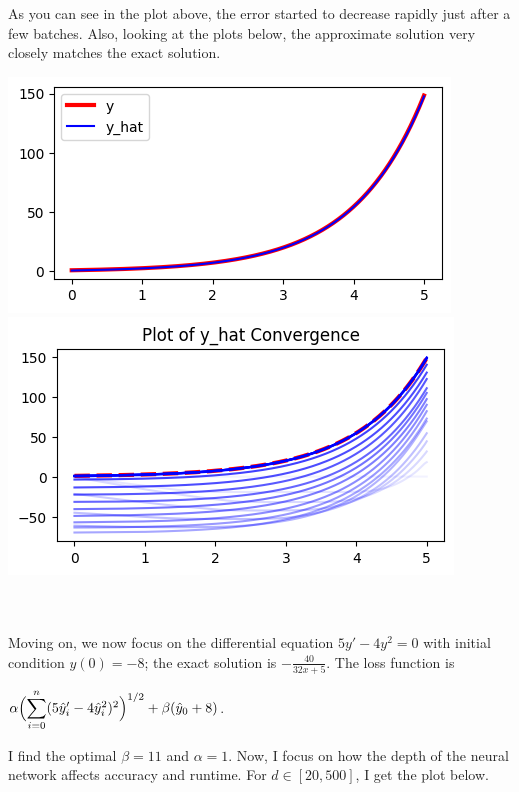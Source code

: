 \documentclass[12pt]{article}
\newcommand{\dsum}[2]{\mathlarger{\sum}_{#1}^{#2}}
\newcommand{\bgc}{\begin{center}}
\newcommand{\enc}{\end{center}}
\begin{document}
\begin{description}
\begin{minipage}{\linewidth}
    \end{minipage}
    As you can see in the plot above, the error started to decrease rapidly
    just after a few batches. Also, looking at the plots below, the approximate
    solution very closely matches the exact solution. \\
    \begin{minipage}{\linewidth}
        \centering
        \includegraphics[scale=.5]{images/figure3.png}
        \includegraphics[scale=.5]{images/figure4.png}
    \end{minipage}
    \hfill \\
    \hline
    \hfill \\
    Moving on, we now focus on the differential equation $5y' - 4y^2 = 0$ with
    initial condition $y(0) = -8$; the exact solution is $-\frac{40}{32x+5}$.
    The loss function is 
    \bgc 
    $\alpha\Bigl(\dsum{i=0}{n}(5\hat{y}_i' - 4\hat{y}_i^2)^2\Bigr)^{1/2} + \beta(\hat{y}_0 + 8)$.
    \enc
    I find the optimal $\beta = 11$ and $\alpha=1$. Now, I focus on how the
    depth of the neural network affects accuracy and runtime. For $d\in[20,
    500]$, I get the plot below.  \\ 
    \begin{minipage}{\linewidth}
        \centering

\end{minipage}
\end{description}
\end{document}
